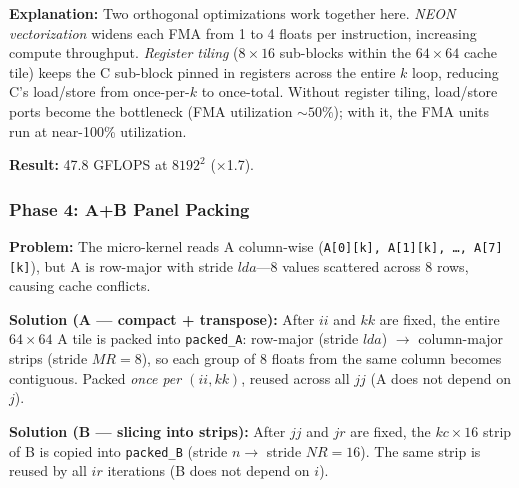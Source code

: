 \documentclass[11pt,a4paper]{article}
\begin{document}
\textbf{Explanation:}
Two orthogonal optimizations work together here.
\emph{NEON vectorization} widens each FMA from 1 to 4 floats per instruction, increasing compute throughput.
\emph{Register tiling} ($8{\times}16$ sub-blocks within the $64{\times}64$ cache tile) keeps the C sub-block pinned in registers across the entire $k$ loop, reducing C's load/store from once-per-$k$ to once-total.
Without register tiling, load/store ports become the bottleneck (FMA utilization ${\sim}50\%$); with it, the FMA units run at near-100\% utilization.

\textbf{Result:} 47.8 GFLOPS at $8192^2$ ($\times$1.7).



\subsubsection{Phase 4: A+B Panel Packing}

\textbf{Problem:} The micro-kernel reads A column-wise
(\texttt{A[0][k], A[1][k], \ldots, A[7][k]}), but A is row-major
with stride $lda$---8 values scattered across 8 rows, causing cache conflicts.

\textbf{Solution (A --- compact + transpose):}
After $ii$ and $kk$ are fixed, the entire $64{\times}64$ A tile is packed into
\texttt{packed\_A}: row-major (stride $lda$) $\to$ column-major strips (stride $MR{=}8$),
so each group of 8 floats from the same column becomes contiguous.
Packed \emph{once per $(ii, kk)$}, reused across all $jj$ (A does not depend on $j$).

\textbf{Solution (B --- slicing into strips):}
After $jj$ and $jr$ are fixed, the $kc{\times}16$ strip of B is copied into
\texttt{packed\_B} (stride $n \to$ stride $NR{=}16$).
The same strip is reused by all $ir$ iterations (B does not depend on $i$).
\end{document}
